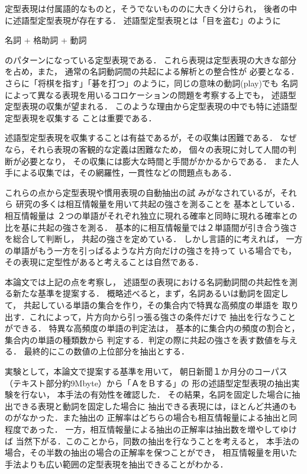 定型表現は付属語的なものと，そうでないもののに大きく分けられ，
後者の中に述語型定型表現が存在する．
述語型定型表現とは「目を盗む」のように
\begin{center}
名詞  +  格助詞  + 動詞
\end{center}
のパターンになっている定型表現である．
これら表現は定型表現の大きな部分を占め，また，
通常の名詞動詞間の共起による解析との整合性が
必要となる\cite{oku,suzuki}．
さらに「将棋を指す」「碁を打つ」のように，同じの意味の動詞(play)でも
名詞によって異なる表現を用いるコロケーションの問題を考察する上でも，
述語型定型表現の収集が望まれる．
このような理由から定型表現の中でも特に述語型定型表現を収集する
ことは重要である．

述語型定型表現を収集することは有益であるが，その収集は困難である．
なぜなら，それら表現の客観的な定義は困難なため，
個々の表現に対して人間の判断が必要となり，
その収集には膨大な時間と手間がかかるからである\cite{syudo}．
また人手による収集では，その網羅性，一貫性などの問題点もある．

これらの点から定型表現や慣用表現の自動抽出の試
みがなされているが\cite{smadja,shinnou}，それら
研究の多くは相互情報量を用いて共起の強さを測ることを
基本としている\cite{church}．
相互情報量は
２つの単語がそれぞれ独立に現れる確率と同時に現れる確率との
比を基に共起の強さを測る．
基本的に相互情報量では２単語間が引き合う強さを総合して判断し，
共起の強さを定めている．
しかし言語的に考えれば，
一方の単語がもう一方を引っぱるような片方向だけの強さを持って
いる場合でも，その表現に定型性があると考えることは自然である．

本論文では上記の点を考察し，
述語型の表現における名詞動詞間の共起性を測る新たな基準を提案する．
概略述べると，まず，名詞あるいは動詞を固定して，
共起している単語の集合を作り，その集合内で特異な高頻度の単語を
取り出す．これによって，片方向から引っ張る強さの条件だけで
抽出を行なうことができる．
特異な高頻度の単語の判定法は，
基本的に集合内の頻度の割合と，集合内の単語の種類数から
判定する．判定の際に共起の強さを表す数値を与える．
最終的にこの数値の上位部分を抽出とする．

実験として，本論文で提案する基準を用いて，
朝日新聞１か月分のコーパス（テキスト部分約9Mbyte）から「ＡをＢする」の
形の述語型定型表現の抽出実験を行ない，
本手法の有効性を確認した．
その結果，名詞を固定した場合に抽出できる表現と動詞を固定した場合に
抽出できる表現には，ほとんど共通のものがなかった．また抽出の
正解率はどちらの場合も相互情報量による抽出と同程度であった．
一方，相互情報量による抽出の正解率は抽出数を増やしてゆけば
当然下がる．このことから，同数の抽出を行なうことを考えると，
本手法の場合，その半数の抽出の場合の正解率を保つことができ，
相互情報量を用いた手法よりも広い範囲の定型表現を抽出できることがわかる．


